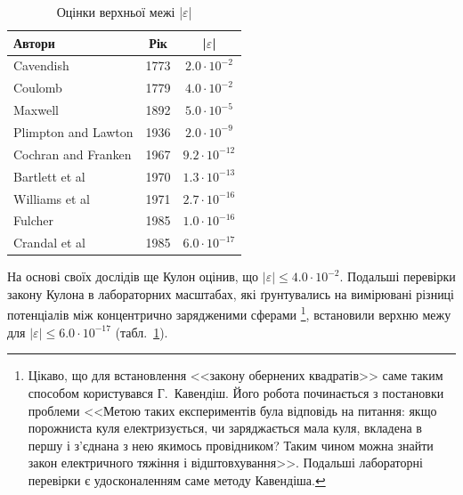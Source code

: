 \documentclass{LabWork}
\begin{document}
\begin{table}\centering\small
\caption{Оцінки  верхньої межі |$\varepsilon$|\protect\footnotemark}
\label{tab:epsilon}
\begin{tabular}{lcc}
    \toprule
    Автори                 & Рік  &      |$\varepsilon$|      \\ \midrule
    Cavendish              & 1773 &  $2.0 \cdot 10^{-2}  $  \\
    Coulomb                & 1779 &  $4.0 \cdot 10^{-2}  $  \\
    Maxwell                & 1892 &  $5.0 \cdot 10^{-5}  $  \\
    Plimpton  and  Lawton  & 1936 &  $2.0 \cdot 10^{-9}  $  \\
    Cochran  and  Franken  & 1967 &  $9.2 \cdot 10^{-12} $  \\
    Bartlett  et  al       & 1970 &  $1.3 \cdot 10^{-13} $  \\
    Williams  et  al       & 1971 &  $2.7 \cdot 10^{-16} $  \\
    Fulcher                & 1985 &  $1.0 \cdot 10^{-16} $  \\
    Crandal et al          & 1985 &  $6.0 \cdot 10^{-17} $  \\
  \bottomrule
\end{tabular}
\end{table}
%
На основі своїх дослідів ще Кулон оцінив, що $|\varepsilon| \le 4.0 \cdot 10^{-2}$. Подальші перевірки закону Кулона в лабораторних масштабах, які ґрунтувались на вимірювані різниці потенціалів між концентрично зарядженими сферами%
%
\footnote{Цікаво, що для встановлення <<закону обернених квадратів>> саме таким способом користувався Г.~Кавендіш. Його робота починається з постановки проблеми <<Метою таких експериментів була відповідь на питання:
якщо порожниста куля електризується, чи заряджається мала куля, вкладена в першу і з'єднана з нею якимось
провідником? Таким чином можна знайти закон електричного тяжіння і відштовхування>>. Подальші лабораторні перевірки є удосконаленням саме методу Кавендіша.
}, %
%
встановили верхню межу для $ |\varepsilon| \le  6.0 \cdot 10^{-17}$ (табл.~\ref{tab:epsilon}). 
\end{document}
